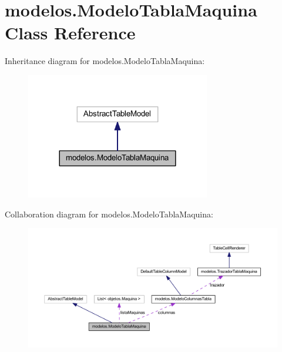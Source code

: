 \hypertarget{classmodelos_1_1_modelo_tabla_maquina}{}\section{modelos.\+Modelo\+Tabla\+Maquina Class Reference}
\label{classmodelos_1_1_modelo_tabla_maquina}


Inheritance diagram for modelos.\+Modelo\+Tabla\+Maquina\+:\nopagebreak
\begin{figure}[H]
\begin{center}
\leavevmode
\includegraphics[width=228pt]{classmodelos_1_1_modelo_tabla_maquina__inherit__graph}
\end{center}
\end{figure}


Collaboration diagram for modelos.\+Modelo\+Tabla\+Maquina\+:\nopagebreak
\begin{figure}[H]
\begin{center}
\leavevmode
\includegraphics[width=350pt]{classmodelos_1_1_modelo_tabla_maquina__coll__graph}
\end{center}
\end{figure}
